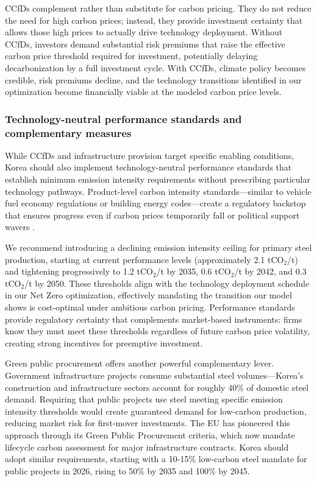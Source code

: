 \documentclass[preprint,1p,authoryear]{elsarticle}
\begin{document}
CCfDs complement rather than substitute for carbon pricing. They do not reduce the need for high carbon prices; instead, they provide investment certainty that allows those high prices to actually drive technology deployment. Without CCfDs, investors demand substantial risk premiums that raise the effective carbon price threshold required for investment, potentially delaying decarbonization by a full investment cycle. With CCfDs, climate policy becomes credible, risk premiums decline, and the technology transitions identified in our optimization become financially viable at the modeled carbon price levels.

\subsubsection{Technology-neutral performance standards and complementary measures}

While CCfDs and infrastructure provision target specific enabling conditions, Korea should also implement technology-neutral performance standards that establish minimum emission intensity requirements without prescribing particular technology pathways. Product-level carbon intensity standards—similar to vehicle fuel economy regulations or building energy codes—create a regulatory backstop that ensures progress even if carbon prices temporarily fall or political support wavers \citep{kuramochi2018beyond}.

We recommend introducing a declining emission intensity ceiling for primary steel production, starting at current performance levels (approximately 2.1 tCO$_2$/t) and tightening progressively to 1.2 tCO$_2$/t by 2035, 0.6 tCO$_2$/t by 2042, and 0.3 tCO$_2$/t by 2050. These thresholds align with the technology deployment schedule in our Net Zero optimization, effectively mandating the transition our model shows is cost-optimal under ambitious carbon pricing. Performance standards provide regulatory certainty that complements market-based instruments: firms know they must meet these thresholds regardless of future carbon price volatility, creating strong incentives for preemptive investment.

Green public procurement offers another powerful complementary lever. Government infrastructure projects consume substantial steel volumes—Korea's construction and infrastructure sectors account for roughly 40\% of domestic steel demand. Requiring that public projects use steel meeting specific emission intensity thresholds would create guaranteed demand for low-carbon production, reducing market risk for first-mover investments. The EU has pioneered this approach through its Green Public Procurement criteria, which now mandate lifecycle carbon assessment for major infrastructure contracts. Korea should adopt similar requirements, starting with a 10-15\% low-carbon steel mandate for public projects in 2026, rising to 50\% by 2035 and 100\% by 2045.
\end{document}
